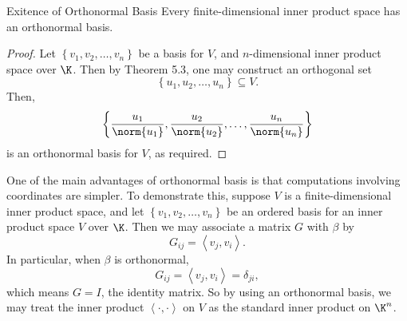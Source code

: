 \documentclass[linearalgebraII]{subfiles}
\begin{document}
    \begin{cor}{Exitence of Orthonormal Basis}
        Every finite-dimensional inner product space has an orthonormal basis.
    \end{cor}	

    \begin{proof}
        Let $\left\lbrace v_1,v_2,\ldots,v_n \right\rbrace$ be a basis for $V$, and $n$-dimensional inner product space over $\K$. Then by Theorem 5.3, one may construct an orthogonal set
        \begin{equation*}
            \left\lbrace u_1,u_2,\ldots,u_n \right\rbrace \subseteq V.
        \end{equation*}
        Then,
        \begin{equation*}
            \left\lbrace \frac{u_1}{\norm{u_1}}, \frac{u_2}{\norm{u_2}}, \ldots, \frac{u_n}{\norm{u_n}} \right\rbrace 
        \end{equation*}
        is an orthonormal basis for $V$, as required.
    \end{proof}

    \begin{remark}
        One of the main advantages of orthonormal basis is that computations involving coordinates are simpler. To demonstrate this, suppose $V$ is a finite-dimensional inner product space, and let
        $\left\lbrace v_1,v_2,\ldots,v_n \right\rbrace$ be an ordered basis for an inner product space $V$ over $\K$. Then we may associate a matrix $G$ with $\beta$ by 
        \begin{equation*}
            G_{ij} = \left\langle v_j, v_i\right\rangle .
        \end{equation*}
        In particular, when $\beta$ is orthonormal,
        \begin{equation*}
            G_{ij} = \left\langle v_j, v_i\right\rangle = \delta_{ji},
        \end{equation*}
        which means $G=I$, the identity matrix. So by using an orthonormal basis, we may treat the inner product $\left\langle \cdot, \cdot\right\rangle$ on $V$ as the standard inner product on $\K^n$.
    \end{remark}
\end{document}
